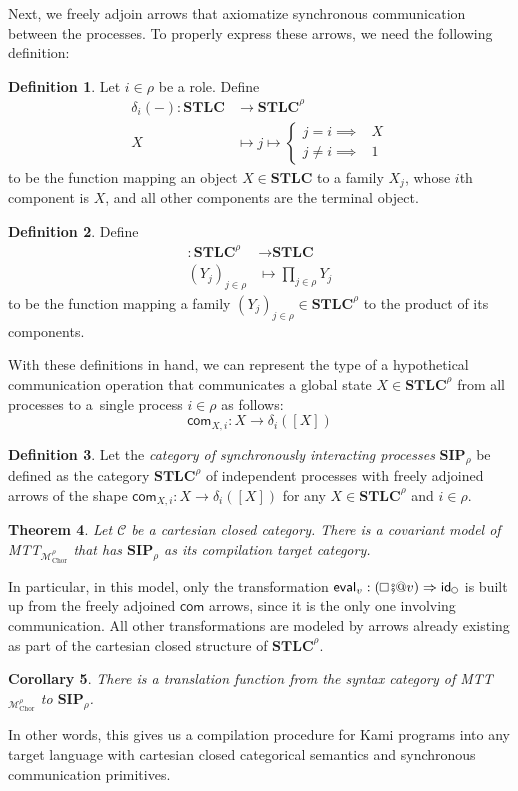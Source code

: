 \documentclass{scrartcl}
\renewcommand{\circle}{\mathop{\mathchoice%
  {\tikz{\draw (0,0) circle [radius=0.1cm];}}%
  {\tikz{\draw (0,0) circle [radius=0.1cm];}}%
  {\tikz{\draw (0,0) circle [radius=0.075cm];}}%
  {\tikz{\draw (0,0) circle [radius=0.05cm];}}}}
\renewcommand{\square}{\mathop{\mathchoice%
  {\tikz{\draw (0,0) rectangle (0.2cm,0.2cm);}}%
  {\tikz{\draw (0,0) rectangle (0.2cm,0.2cm);}}%
  {\tikz{\draw (0,0) rectangle (0.15cm,0.15cm);}}%
  {\tikz{\draw (0,0) rectangle (0.10cm,0.10cm);}}}}
\theoremstyle{definition}
\newtheorem{definition}{Definition}
\theoremstyle{plain}
\newtheorem{theorem}[definition]{Theorem}
\newtheorem{corollary}[definition]{Corollary}
\newcommand{\modetheory}[1]{\mathcal{#1}}
\newcommand{\M}{\modetheory{M}}
\newcommand{\MrhoChor}{\M^\rho_{\textrm{Chor}}}
\newcommand{\MTTMrhoChor}{MTT${}_{\MrhoChor}$}
\begin{document}
Next, we freely adjoin arrows that axiomatize synchronous communication between
the processes. To properly express these arrows, we need the following
definition:
\begin{definition}
  Let $i\in\rho$ be a role. Define
  \begin{align*}
    \delta_i({-}) : \textbf{STLC} &\to \textbf{STLC}^\rho \\
    X &\mapsto j \mapsto
    \begin{cases}
      j = i \implies &X\\
      j \neq i \implies &1
    \end{cases}
  \end{align*}
  to be the function mapping an object $X \in \textbf{STLC}$ to a family
  $X_j$, whose $i$th component is $X$, and all other components are the
  terminal object.
\end{definition}
\begin{definition} Define
  \begin{align*}
    [{-}] : \textbf{STLC}^\rho &\to \textbf{STLC} \\
    (Y_j)_{j\in\rho} &\mapsto \prod_{j \in \rho} Y_j
  \end{align*}
  to be the function mapping a family $(Y_j)_{j\in\rho} \in \textbf{STLC}^\rho$
  to the product of its components.
\end{definition}
With these definitions in hand, we can represent the type of a hypothetical
communication operation that communicates a global state $X \in
\textbf{STLC}^\rho$ from all processes to a~single process $i \in \rho$ as
follows:
\[
  \textsf{com}_{X,i} : X \to \delta_i([X])
\]
\begin{definition}
  Let the \emph{category of synchronously interacting processes}
  $\textbf{SIP}_{\rho}$ be
  defined as the category $\textbf{STLC}^\rho$ of independent processes with
  freely adjoined arrows of the shape $\textsf{com}_{X,i} : X \to
  \delta_i([X])$ for any $X \in \textbf{STLC}^\rho$ and $i \in \rho$.
\end{definition}
\begin{theorem}
  Let {\upshape$\mathcal{C}$} be a cartesian closed category. There is a
  covariant model of {\upshape \MTTMrhoChor} that has
  {\upshape$\textbf{SIP}_{\rho}$} as its compilation target category.
\end{theorem}
In particular, in this model, only the transformation $\textsf{eval}_v :
(\square \fatsemi @v) \Rightarrow \textsf{id}_{\circle}$ is built up from the
freely adjoined $\textsf{com}$ arrows, since it is the only one involving
communication. All other transformations are modeled by arrows already existing
as part of the cartesian closed structure of $\textbf{STLC}^\rho$.
\begin{corollary}
  There is a translation function from the syntax category of {\upshape
  \MTTMrhoChor} to {\upshape$\textbf{SIP}_{\rho}$}.
\end{corollary}
In other words, this gives us a compilation procedure for Kami programs into
any target language with cartesian closed categorical semantics and synchronous
communication primitives.
\end{document}
